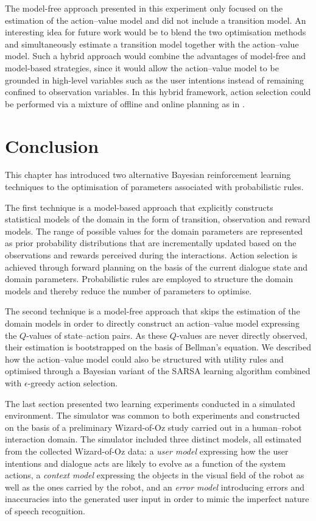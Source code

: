 The model-free approach presented in this experiment only focused on the estimation of the action--value model and did not include a transition model.  An interesting idea for future work would be to blend the two optimisation methods and simultaneously estimate a transition model together with the action--value model.  Such a hybrid approach would combine the advantages of model-free and model-based strategies, since it would allow the action--value model to be grounded in high-level variables such as the user intentions instead of remaining confined to observation variables. In this hybrid framework, action selection could be performed via a mixture of offline and online planning as in \cite{RossC07}. 

\section{Conclusion}


This chapter has introduced two alternative Bayesian reinforcement learning techniques to the optimisation of parameters associated with probabilistic rules.

The first technique is a model-based approach that explicitly constructs statistical models of the domain in the form of transition, observation and reward models.  The range of possible values for the domain parameters are represented as prior probability distributions that are incrementally updated based on the observations and rewards perceived during the interactions. Action selection is achieved through forward planning on the basis of the current dialogue state and domain parameters. Probabilistic rules are employed to structure the domain models and thereby reduce the number of parameters to optimise. 

The second technique is a model-free approach that skips the estimation of the domain models in order to directly construct an action--value model expressing the $Q$-values of state--action pairs.  As these $Q$-values are never directly observed, their estimation is bootstrapped on the basis of Bellman's equation. We described how the action--value model could also be structured with utility rules and optimised through a Bayesian variant of the SARSA learning algorithm combined with $\epsilon$-greedy action selection. 

The last section presented two learning experiments conducted in a simulated environment.  The simulator was common to both experiments and constructed on the basis of a preliminary Wizard-of-Oz study carried out in a human--robot interaction domain. The simulator included three distinct models, all estimated from the collected Wizard-of-Oz data: a \textit{user model} expressing how the user intentions and dialogue acts are likely to evolve as a function of the system actions, a \textit{context model} expressing the objects in the visual field of the robot as well as the ones carried by the robot, and an \textit{error model} introducing errors and inaccuracies into the generated user input in order to mimic the imperfect nature of speech recognition.

